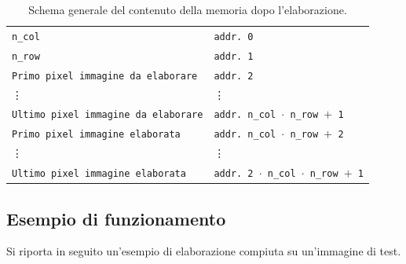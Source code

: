 \documentclass{article}
\begin{document}
\vspace{0,5cm} %

\begin{table}[h]
    \centering
    \def\arraystretch{1.3} %

    \caption{Schema generale del contenuto della memoria dopo l'elaborazione.}

    \begin{tabular}{ |m{4cm} | m{5cm} }
        \cline{1-1}
        \texttt{n\_col} & \texttt{addr. 0} \\
        \cline{1-1}
        \texttt{n\_row} & \texttt{addr. 1} \\
        \cline{1-1}
        \texttt{Primo pixel immagine da elaborare} & \texttt{addr. 2} \\
        \cline{1-1}
        \vdots & \vdots \\
        \cline{1-1}
        \texttt{Ultimo pixel immagine da elaborare} & \texttt{addr. n\_col $\cdot$ n\_row $+$ 1} \\
        \cline{1-1}
        \texttt{Primo pixel immagine elaborata} & \texttt{addr. n\_col $\cdot$ n\_row $+$ 2} \\
        \cline{1-1}
        \vdots & \vdots \\
        \cline{1-1}
        \texttt{Ultimo pixel immagine elaborata} & \texttt{addr. 2 $\cdot$ n\_col $\cdot$ n\_row $+$ 1} \\
        \cline{1-1}    
        \end{tabular}
    
    \label{tab:schemamem}
    
\end{table}

\vspace{0.3cm}

\subsection{Esempio di funzionamento} %
Si riporta in seguito un'esempio di elaborazione compiuta su un'immagine di test.

\pagebreak
\end{document}
